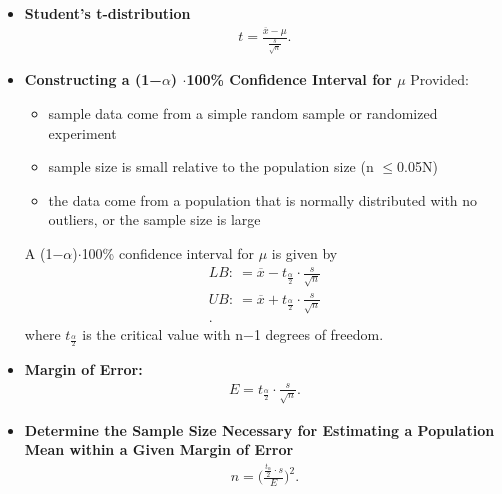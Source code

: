 \documentclass{report}
\begin{document}
     \begin{itemize}
        \item \textbf{Student’s t-distribution}
            \begin{align*}
               t = \frac{\overline{x}-\mu}{\frac{s}{\sqrt{n}}} 
            .\end{align*}
        \item \textbf{Constructing a (1−$\alpha $) $ \cdot $100\% Confidence Interval for $\mu$}
            Provided:
            \begin{itemize}
                \item sample data come from a simple random sample or randomized experiment
                \item sample size is small relative to the population size (n $ \leq $0.05N)
                \item the data come from a population that is normally distributed with no outliers, or the sample size is large
            \end{itemize}
            A (1−$\alpha $)$\cdot$100\% confidence interval for $\mu$ is given by
            \begin{align*}
                LB:\ = \overline{x}  - t_{\frac{\alpha}{2}} \cdot \frac{s}{\sqrt{n}} \\
                UB:\ = \overline{x}  + t_{\frac{\alpha}{2}} \cdot \frac{s}{\sqrt{n}} \\
            .\end{align*}
            where $t_{\frac{\alpha}{2}} $ is the critical value with n−1 degrees of freedom.
        \item \textbf{Margin of Error:}
            \begin{align*}
                E = t_{\frac{\alpha}{2}} \cdot \frac{s}{\sqrt{n}}
            .\end{align*}
        \item \textbf{Determine the Sample Size Necessary for Estimating a Population Mean within a Given Margin of Error}
            \begin{align*}
                n = \bigg(\frac{\frac{t_{\alpha}}{2}\cdot s}{E}\bigg)^{2}
            .\end{align*}
     \end{itemize}
\end{document}
